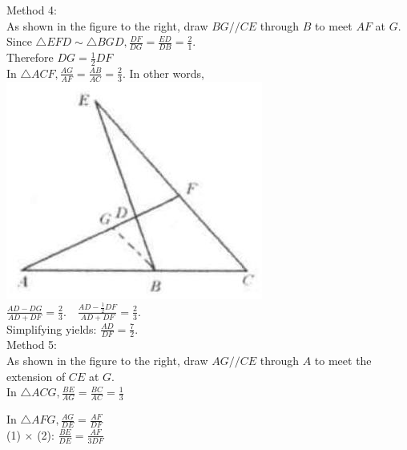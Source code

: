 \documentclass{article}
\begin{document}
Method 4:\\
As shown in the figure to the right, draw \(B G / / C E\) through \(B\) to meet \(A F\) at \(G\).\\
Since \(\triangle E F D \sim \triangle B G D, \frac{D F}{D G}=\frac{E D}{D B}=\frac{2}{1}\).\\
Therefore \(D G=\frac{1}{2} D F\)\\
In \(\triangle A C F, \frac{A G}{A F}=\frac{A B}{A C}=\frac{2}{3}\). In other words,\\
\centering
\includegraphics[width=\textwidth]{images/112.jpg}\\
\(\frac{A D-D G}{A D+D F}=\frac{2}{3} . \quad \frac{A D-\frac{1}{2} D F}{A D+D F}=\frac{2}{3}\).\\
Simplifying yields: \(\frac{A D}{D F}=\frac{7}{2}\).\\
Method 5:\\
As shown in the figure to the right, draw \(A G / / C E\) through \(A\) to meet the extension of \(C E\) at \(G\).\\
In \(\triangle A C G, \frac{B E}{A G}=\frac{B C}{A C}=\frac{1}{3}\)


In \(\triangle A F G, \frac{A G}{D E}=\frac{A F}{D F}\)\\
(1) \(\times\) (2): \(\frac{B E}{D E}=\frac{A F}{3 D F}\)
\end{document}
